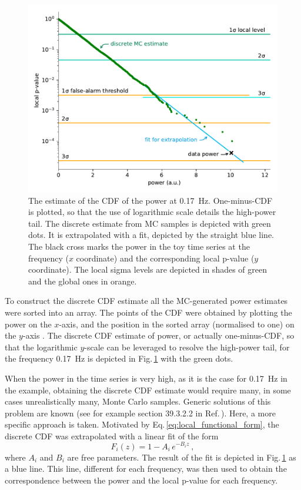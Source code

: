 \begin{figure}
  \centering
  \includegraphics[width=\linewidth]{gfx/axions/MC_estimation_local.pdf}
  \caption{The estimate of the CDF of the power at \SI{0.17}{\hertz}.
  One-minus-CDF is plotted, so that the use of logarithmic scale details the high-power tail.
  The discrete estimate from MC samples is depicted with green dots.
  It is extrapolated with a fit, depicted by the straight blue line.
  The black cross marks the power in the toy time series at the frequency ($x$ coordinate) and the corresponding local p-value ($y$ coordinate).
  The local sigma levels are depicted in shades of green and the global ones in orange.}\label{fig:P_best_signal_candidate}
\end{figure}

To construct the discrete CDF estimate all the MC-generated power estimates were sorted into an array.
The points of the CDF were obtained by plotting the power on the $x$-axis, and the position in the sorted array (normalised to one) on the $y$-axis .
The discrete CDF estimate of power, or actually one-minus-CDF, so that the logarithmic $y$-scale can be leveraged to resolve the high-power tail, for the frequency \SI{0.17}{\hertz} is depicted in Fig.\,\ref{fig:P_best_signal_candidate} with the green dots.

When the power in the time series is very high, as it is the case for \SI{0.17}{\hertz} in the example, obtaining the discrete CDF estimate would require many, in some cases unrealistically many, Monte Carlo samples.
Generic solutions of this problem are known (see for example section 39.3.2.2 in Ref.\,\cite{PDG2016}).
Here, a more specific approach is taken.
Motivated by Eq.\,\ref{eq:local_functional_form}, the discrete CDF was extrapolated with a linear fit of the form
\begin{equation}
  F_i(z) = 1 - A_i \, e^{-B_i z} \ ,
\end{equation}
where $A_i$ and $B_i$ are free parameters.
The result of the fit is depicted in Fig.\,\ref{fig:P_best_signal_candidate} as a blue line.
This line, different for each frequency, was then used to obtain the correspondence between the power and the local p-value for each frequency.


